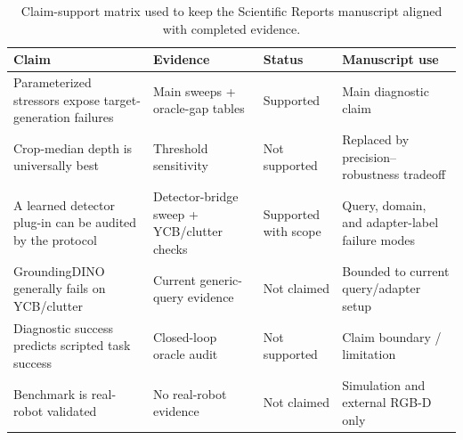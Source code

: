 \begin{table}[t]
\centering
\caption{Claim-support matrix used to keep the Scientific Reports manuscript aligned with completed evidence.}
\label{tab:claim-support-matrix}
\scriptsize
\begin{tabular}{llll}
\toprule
Claim & Evidence & Status & Manuscript use \\
\midrule
Parameterized stressors expose target-generation failures & Main sweeps + oracle-gap tables & Supported & Main diagnostic claim \\
Crop-median depth is universally best & Threshold sensitivity & Not supported & Replaced by precision--robustness tradeoff \\
A learned detector plug-in can be audited by the protocol & Detector-bridge sweep + YCB/clutter checks & Supported with scope & Query, domain, and adapter-label failure modes \\
GroundingDINO generally fails on YCB/clutter & Current generic-query evidence & Not claimed & Bounded to current query/adapter setup \\
Diagnostic success predicts scripted task success & Closed-loop oracle audit & Not supported & Claim boundary / limitation \\
Benchmark is real-robot validated & No real-robot evidence & Not claimed & Simulation and external RGB-D only \\
\bottomrule
\end{tabular}
\end{table}
